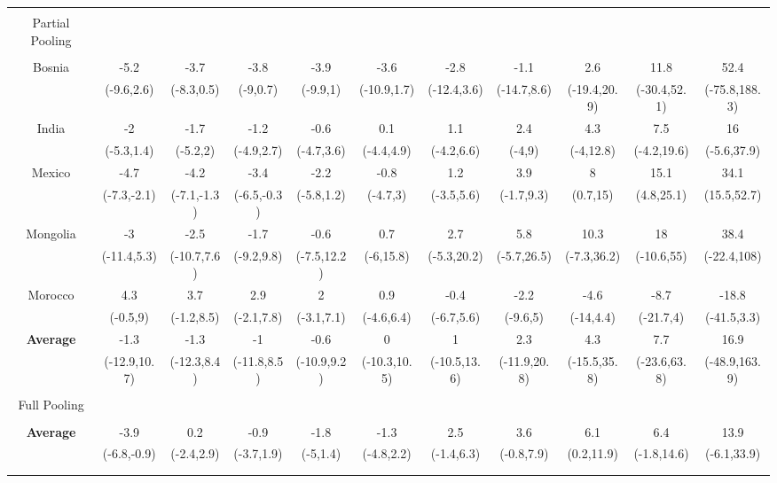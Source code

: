 \documentclass[AER]{AEA}
\begin{document}
\begin{landscape}
\begin{table}[!htbp]
\begin{tabular}{@{\extracolsep{5pt}} ccccccccccc}
\hline \\[-1.8ex]
Partial Pooling &&&&&&&&&& \\
\hline \\[-1.8ex]
Bosnia & -5.2 & -3.7 & -3.8 & -3.9 & -3.6 & -2.8 & -1.1 & 2.6 & 11.8 & 52.4 \\ 
& (-9.6,2.6) & (-8.3,0.5) & (-9,0.7) & (-9.9,1) & (-10.9,1.7) & (-12.4,3.6) & (-14.7,8.6) & (-19.4,20.9) & (-30.4,52.1) & (-75.8,188.3) \\ 
India & -2 & -1.7 & -1.2 & -0.6 & 0.1 & 1.1 & 2.4 & 4.3 & 7.5 & 16 \\ 
& (-5.3,1.4) & (-5.2,2) & (-4.9,2.7) & (-4.7,3.6) & (-4.4,4.9) & (-4.2,6.6) & (-4,9) & (-4,12.8) & (-4.2,19.6) & (-5.6,37.9) \\ 
 Mexico &  -4.7 & -4.2 & -3.4 & -2.2 & -0.8 & 1.2 & 3.9 & 8 & 15.1 & 34.1 \\ 
 &  (-7.3,-2.1) & (-7.1,-1.3) & (-6.5,-0.3) & (-5.8,1.2) & (-4.7,3) & (-3.5,5.6) & (-1.7,9.3) & (0.7,15) & (4.8,25.1) & (15.5,52.7) \\ 
Mongolia &  -3 & -2.5 & -1.7 & -0.6 & 0.7 & 2.7 & 5.8 & 10.3 & 18 & 38.4 \\ 
 &(-11.4,5.3) & (-10.7,7.6) & (-9.2,9.8) & (-7.5,12.2) & (-6,15.8) & (-5.3,20.2) & (-5.7,26.5) & (-7.3,36.2) & (-10.6,55) & (-22.4,108) \\ 
 Morocco &  4.3 & 3.7 & 2.9 & 2 & 0.9 & -0.4 & -2.2 & -4.6 & -8.7 & -18.8 \\ 
& (-0.5,9) & (-1.2,8.5) & (-2.1,7.8) & (-3.1,7.1) & (-4.6,6.4) & (-6.7,5.6) & (-9.6,5) & (-14,4.4) & (-21.7,4) & (-41.5,3.3) \\ 
\hline
\textbf{Average} & -1.3 & -1.3 & -1 & -0.6 & 0 & 1 & 2.3 & 4.3 & 7.7 & 16.9 \\ 
 & (-12.9,10.7) & (-12.3,8.4) & (-11.8,8.5) & (-10.9,9.2) & (-10.3,10.5) & (-10.5,13.6) & (-11.9,20.8) & (-15.5,35.8) & (-23.6,63.8) & (-48.9,163.9) \\ 
 \hline \\[-1.8ex]
Full Pooling &&&&&&&&&& \\
\hline \\[-1.8ex]
\textbf{Average}  & -3.9 & 0.2 & -0.9 & -1.8 & -1.3 & 2.5 & 3.6 & 6.1 & 6.4 & 13.9 \\
 &  (-6.8,-0.9) & (-2.4,2.9) & (-3.7,1.9) & (-5,1.4) & (-4.8,2.2) & (-1.4,6.3) & (-0.8,7.9) & (0.2,11.9) & (-1.8,14.6) & (-6.1,33.9) \\ 

\hline \\[-1.8ex]

\hline \\[-1.8ex]


\end{tabular}
\end{table}
\end{landscape}
\end{document}
